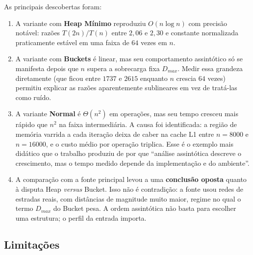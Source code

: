 \documentclass[12pt,a4paper]{article}
\begin{document}
As principais descobertas foram:

\begin{enumerate}
  \item A variante com \textbf{Heap Mínimo} reproduziu $O(n\log n)$ com
        precisão notável: razões $T(2n)/T(n)$ entre $2{,}06$ e $2{,}30$ e
        constante normalizada praticamente estável em uma faixa de $64$ vezes
        em $n$.
  \item A variante com \textbf{Buckets} é linear, mas seu comportamento
        assintótico só se manifesta depois que $n$ supera a sobrecarga fixa
        $D_{max}$. Medir essa grandeza diretamente (que ficou entre $1737$ e
        $2615$ enquanto $n$ crescia $64$ vezes) permitiu explicar as razões
        aparentemente sublineares em vez de tratá-las como ruído.
  \item A variante \textbf{Normal} é $\Theta(n^2)$ em operações, mas seu
        tempo cresceu mais rápido que $n^2$ na faixa intermediária. A causa
        foi identificada: a região de memória varrida a cada iteração deixa
        de caber na cache L1 entre $n = 8000$ e $n = 16000$, e o custo médio
        por operação triplica. Esse é o exemplo mais didático que o trabalho
        produziu de por que ``análise assintótica descreve o crescimento, mas
        o tempo medido depende da implementação e do ambiente''.
  \item A comparação com a fonte principal levou a uma \textbf{conclusão
        oposta} quanto à disputa Heap \emph{versus} Bucket. Isso não é
        contradição: a fonte usou redes de estradas reais, com distâncias de
        magnitude muito maior, regime no qual o termo $D_{max}$ do Bucket
        pesa. A ordem assintótica não basta para escolher uma estrutura; o
        perfil da entrada importa.
\end{enumerate}

\subsection*{Limitações}
\end{document}
